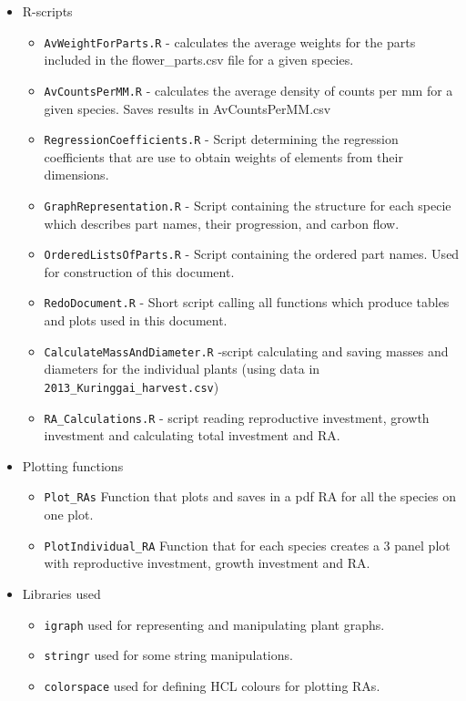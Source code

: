 \documentclass[10pt]{book} %
\begin{document}
\begin{itemize}
\begin{itemize}
\end{itemize}
\item{R-scripts}
\begin{itemize}
\item \texttt{AvWeightForParts.R} - calculates the average weights for the parts included in the {flower\_parts.csv} file for a given species.
\item \texttt{AvCountsPerMM.R} - calculates the average density of counts per mm for a given species. Saves results in AvCountsPerMM.csv
\item \texttt{RegressionCoefficients.R} - Script determining the regression coefficients that are use to obtain weights of elements from their dimensions.
\item \texttt{GraphRepresentation.R} - Script containing the structure for each specie which describes part names, their progression, and carbon flow.
\item \texttt{OrderedListsOfParts.R} - Script containing the ordered part names. Used for construction of this document.
\item \texttt{RedoDocument.R} - Short script calling all functions which produce tables and plots used in this document.
\item \texttt{CalculateMassAndDiameter.R} -script calculating and saving masses and diameters for the individual plants (using data in \texttt{2013\_Kuringgai\_harvest.csv})
\item \texttt{RA\_Calculations.R} - script reading reproductive investment, growth investment and calculating total investment and RA.
\end{itemize}
\item{Plotting functions}
\begin{itemize}
\item \texttt{Plot\_RAs} Function that plots and saves in a pdf RA for all the species on one plot.
\item \texttt{PlotIndividual\_RA} Function that for each species creates a 3 panel plot with reproductive investment, growth investment and RA.
\end{itemize}
\item Libraries used
\begin{itemize}
\item \texttt{igraph} used for representing and manipulating plant graphs.
\item \texttt{stringr} used for some string manipulations.
\item \texttt{colorspace} used for defining HCL colours for plotting RAs.
\end{itemize}
\end{itemize}
\end{document}
